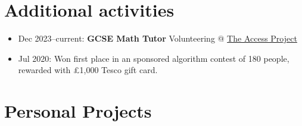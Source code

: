   \section{Additional activities}

  \begin{itemize}
    \item Dec 2023--current: \textbf{GCSE Math Tutor} \dashdiv{} Volunteering @ \href{https://www.theaccessproject.org.uk}{\color{link}The Access Project}
    \item Jul 2020: Won first place in an sponsored algorithm contest of 180 people, rewarded with £1,000 Tesco gift card.
  \end{itemize}

  \section{Personal Projects}

